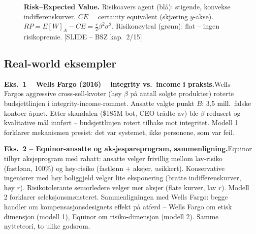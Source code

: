 \begin{figure}[H]
\centering
{}
\caption{\textbf{Risk--Expected Value.} Risikoavers agent (blå): stigende, konvekse indifferenskurver. $CE$ = certainty equivalent (skjæring $y$-akse). $RP = E[W]_A - CE = \tfrac{r}{2}\beta^2\sigma^2$. Risikonøytral (grønn): flat -- ingen risikopremie. [SLIDE -- BSZ kap.\ 2/15]}
\end{figure}

\subsection*{Real-world eksempler}

\textbf{Eks.~1 -- Wells Fargo (2016) -- integrity vs.\ income i praksis.}\quad [EKS]
Wells Fargos aggressive cross-sell-kvoter (høy $\beta$ på antall solgte produkter) roterte budsjettlinjen i integrity-income-rommet. Ansatte valgte punkt $B$: 3{,}5 mill.\ falske kontoer åpnet. Etter skandalen (\$185M bot, CEO trådte av) ble $\beta$ redusert og kvalitative mål innført -- budsjettlinjen rotert tilbake mot integritet. Modell 1 forklarer mekanismen presist: det var systemet, ikke personene, som var feil.

\textbf{Eks.~2 -- Equinor-ansatte og aksjespareprogram, sammenligning.}\quad [EKS]
Equinor tilbyr aksjeprogram med rabatt: ansatte velger frivillig mellom lav-risiko (fastlønn, 100\%) og høy-risiko (fastlønn + aksjer, usikkert). Konservative ingeniører med høy boliggjeld velger lite eksponering (bratte indifferenskurver, høy $r$). Risikotolerante seniorledere velger mer aksjer (flate kurver, lav $r$). Modell 2 forklarer seleksjonsmønsteret. Sammenligningen med Wells Fargo: begge handler om kompensasjonsdesignets effekt på atferd -- Wells Fargo om etisk dimensjon (modell 1), Equinor om risiko-dimensjon (modell 2). Samme nytteteori, to ulike godsrom.

